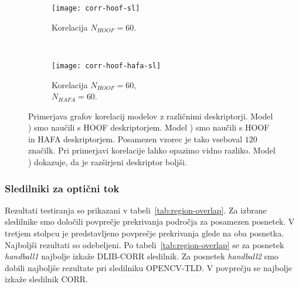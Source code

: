 \begin{figure}[!htbp]
	\centering
	\begin{subfigure}[t]{0.45\columnwidth}
		\texttt{[image: corr-hoof-sl]}
		\caption{Korelacija $N_{HOOF}=60$.}
		\label{fig:izbira-hoof}
	\end{subfigure}
	~
	\begin{subfigure}[t]{0.45\columnwidth}
		\texttt{[image: corr-hoof-hafa-sl]}
		\caption{Korelacija $N_{HOOF}=60$,\\$N_{HAFA}=60$.}
		\label{fig:izbira-hoofhafa}
	\end{subfigure}
	\caption[Primerjava modelov s HOOF in HOOF-HAFA deskriptorji]{Primerjava grafov korelacij modelov z različnimi deskriptorji. Model ) smo naučili s HOOF deskriptorjem. Model ) smo naučili s HOOF in HAFA deskriptorjem. Posamezen vzorec je tako vseboval $120$ značilk. Pri primerjavi korelacije lahko opazimo vidno razliko. Model ) dokazuje, da je razširjeni deskriptor boljši.}
	\label{fig:izbira}
\end{figure}




















\subsubsection{Sledilniki za optični tok} \label{sec:rezultati-sledilnikov-za-opticni-tok}


Rezultati testiranja so prikazani v tabeli~\ref{tab:region-overlap}. Za izbrane sledilnike smo določili povprečje prekrivanja področja za posamezen posnetek. V tretjem stolpcu je predstavljeno povprečje prekrivanja glede na oba posnetka. Najboljši rezultati so odebeljeni. Po tabeli~\ref{tab:region-overlap} se za posnetek \textit{handball1} najbolje izkaže DLIB-CORR sledilnik. Za posnetek \textit{handball2} smo dobili najboljše rezultate pri sledilniku OPENCV-TLD. V povprečju se najbolje izkaže sledilnik CORR.





